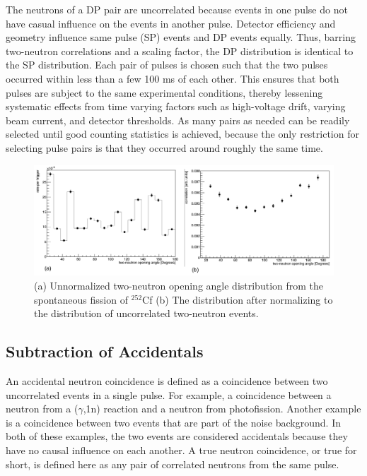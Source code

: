 The neutrons of a DP pair are uncorrelated because events in one pulse do not have casual influence on the events in another pulse.
Detector efficiency and geometry influence same pulse (SP) events and DP events equally.
Thus, barring two-neutron correlations and a scaling factor, the DP distribution is identical to the SP distribution.
Each pair of pulses is chosen such that the two pulses occurred within less than a few 100 ms of each other.
This ensures that both pulses are subject to the same experimental conditions, thereby lessening systematic effects from time varying factors such as high-voltage drift, varying beam current, and detector thresholds.
As many pairs as needed can be readily selected until good counting statistics is achieved, because the only restriction for selecting pulse pairs is that they occurred around roughly the same time.
\begin{figure}
    \centering
    \includegraphics[width  = \textwidth ]{Content/Methods/Normalization.png}
    \caption{(a) Unnormalized two-neutron opening angle distribution from the spontaneous fission of $^{252}$Cf (b) The distribution after normalizing to the distribution of uncorrelated two-neutron events.}
    \label{fig:Cf252Normalization}
    \label{fig:Cf252Normalization}
\end{figure}

\subsection{Subtraction of Accidentals}
\label{Subtraction of Accidentals}
An accidental neutron coincidence is defined as a coincidence between two uncorrelated events in a single pulse.
For example, a coincidence between a neutron from a ($\gamma$,1n) reaction and a neutron from photofission.
Another example is a coincidence between two events that are part of the noise background.
In both of these examples, the two events are considered accidentals because they have no causal influence on each another.
A true neutron coincidence, or true for short, is defined here as any pair of correlated neutrons from the same pulse.

